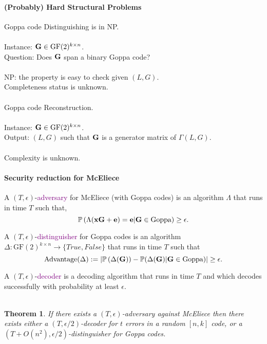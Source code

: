 \documentclass[a4paper, 11pt, openany]{book}
\numberwithin{equation}{section}
\theoremstyle{plain}
\newtheorem{theorem}	[equation]	{Theorem}
\theoremstyle{definition}
\newcommand{\GF}{\mathrm{GF}}
\newcommand{\probability}{\mathbb{P}}
\newcommand{\Define}[1]{\textcolor{purple}{#1}}
\begin{document}
\paragraph{(Probably) Hard Structural Problems}

Goppa code Distinguishing is in NP.\\
~\\
Instance: ${\bf G} \in \GF(2)^{k \times n}$.\\
Question: Does ${\bf G}$ span a binary Goppa code?\\
~\\
NP: the property is easy to check given $(L, G)$.\\
Completeness status is unknown.\\
~\\
Goppa code Reconstruction.\\
~\\
Instance: ${\bf G} \in \GF(2)^{k \times n}$.\\
Output: $(L, G)$ such that ${\bf G}$ is a generator matrix of $\Gamma(L,G)$.\\
~\\
Complexity is unknown.



\paragraph{Security reduction for McEliece}
A $(T, \epsilon)$-\Define{adversary} for McEliece (with Goppa codes) is an algorithm $\Lambda$ that runs in time $T$ such that,
\[
	\probability \left( \Lambda( {\bf x} {\bf G} + {\bf e} ) = {\bf e} | {\bf G} \in \text{Goppa} \right) \ge \epsilon.
\]

A $(T, \epsilon)$-\Define{distinguisher} for Goppa codes is an algorithm $\Delta : \GF(2)^{k \times n} \to \{ True, False \}$ that runs in time $T$ such that
\[
	\mathrm{Advantage}(\Delta) := \left| \probability \left( \Delta({\bf G}) ) - \probability( \Delta({\bf G}) | {\bf G} \in \text{Goppa} \right) \right| \ge \epsilon.
\]

A $(T, \epsilon)$-\Define{decoder} is a decoding algorithm that runs in time $T$ and which decodes successfully with probability at least $\epsilon$.\\
~\\
\begin{theorem} 
If there exists a $(T, \epsilon)$-adversary against McEliece then there
exists either a $(T, \epsilon/2)$-decoder for $t$ errors in a random $[n, k]$ code,
or a $(T +O(n^2), \epsilon/2)$-distinguisher for Goppa codes.
\end{theorem}
\end{document}
